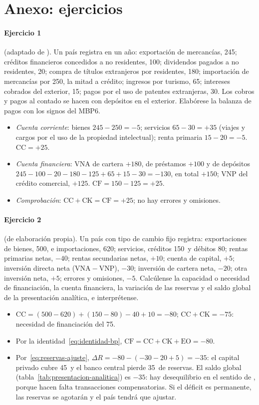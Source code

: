 \documentclass[11pt]{article}
\begin{document}
\section{Anexo: ejercicios}\label{anexo:ejercicios}

\paragraph{Ejercicio 1} (adaptado de \textcite{MunozCidad2020}). Un país registra en un año: exportación de mercancías, 245; créditos financieros concedidos a no residentes, 100; dividendos pagados a no residentes, 20; compra de títulos extranjeros por residentes, 180; importación de mercancías por 250, la mitad a crédito; ingresos por turismo, 65; intereses cobrados del exterior, 15; pagos por el uso de patentes extranjeras, 30. Los cobros y pagos al contado se hacen con depósitos en el exterior. Elabórese la balanza de pagos con los signos del MBP6.
\begin{itemize}
\item \emph{Cuenta corriente}: bienes $245-250=-5$; servicios $65-30=+35$ (viajes y cargos por el uso de la propiedad intelectual); renta primaria $15-20=-5$. $\mathrm{CC}=+25$.
\item \emph{Cuenta financiera}: VNA de cartera $+180$, de préstamos $+100$ y de depósitos $245-100-20-180-125+65+15-30=-130$, en total $+150$; VNP del crédito comercial, $+125$. $\mathrm{CF}=150-125=+25$.
\item \emph{Comprobación}: $\mathrm{CC}+\mathrm{CK}=\mathrm{CF}=+25$; no hay errores y omisiones.
\end{itemize}

\paragraph{Ejercicio 2} (de elaboración propia). Un país con tipo de cambio fijo registra: exportaciones de bienes, 500, e importaciones, 620; servicios, créditos 150~y débitos 80; rentas primarias netas, $-40$; rentas secundarias netas, $+10$; cuenta de capital, $+5$; inversión directa neta ($\mathrm{VNA}-\mathrm{VNP}$), $-30$; inversión de cartera neta, $-20$; otra inversión neta, $+5$; errores y omisiones, $-5$. Calcúlense la capacidad o necesidad de financiación, la cuenta financiera, la variación de las reservas y el saldo global de la presentación analítica, e interprétense.
\begin{itemize}
\item $\mathrm{CC}=(500-620)+(150-80)-40+10=-80$; $\mathrm{CC}+\mathrm{CK}=-75$: necesidad de financiación del 75.
\item Por la identidad~\eqref{eq:identidad-bp}, $\mathrm{CF}=\mathrm{CC}+\mathrm{CK}+\mathrm{EO}=-80$.
\item Por~\eqref{eq:reservas-ajuste}, $\Delta R=-80-(-30-20+5)=-35$: el capital privado cubre 45~y el banco central pierde 35~de reservas. El saldo global (tabla~\ref{tab:presentacion-analitica}) es $-35$: hay desequilibrio en el sentido de , porque hacen falta transacciones compensatorias. Si el déficit es permanente, las reservas se agotarán y el país tendrá que ajustar.
\end{itemize}
\end{document}
